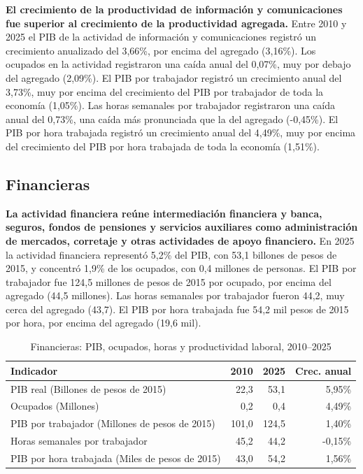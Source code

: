 \textbf{El crecimiento de la productividad de información y comunicaciones fue superior al crecimiento de la productividad agregada.} Entre 2010 y 2025 el PIB de la actividad de información y comunicaciones registró un crecimiento anualizado del 3,66\%, por encima del agregado (3,16\%). Los ocupados en la actividad registraron una caída anual del 0,07\%, muy por debajo del agregado (2,09\%). El PIB por trabajador registró un crecimiento anual del 3,73\%, muy por encima del crecimiento del PIB por trabajador de toda la economía (1,05\%). Las horas semanales por trabajador registraron una caída anual del 0,73\%, una caída más pronunciada que la del agregado (-0,45\%). El PIB por hora trabajada registró un crecimiento anual del 4,49\%, muy por encima del crecimiento del PIB por hora trabajada de toda la economía (1,51\%).

\subsection{Financieras}

\textbf{La actividad financiera reúne intermediación financiera y banca, seguros, fondos de pensiones y servicios auxiliares como administración de mercados, corretaje y otras actividades de apoyo financiero.} En 2025 la actividad financiera representó 5,2\% del PIB, con 53,1 billones de pesos de 2015, y concentró 1,9\% de los ocupados, con 0,4 millones de personas. El PIB por trabajador fue 124,5 millones de pesos de 2015 por ocupado, por encima del agregado (44,5 millones). Las horas semanales por trabajador fueron 44,2, muy cerca del agregado (43,7). El PIB por hora trabajada fue 54,2 mil pesos de 2015 por hora, por encima del agregado (19,6 mil).

\begin{table}[H]
\centering
\caption{Financieras: PIB, ocupados, horas y productividad laboral, 2010--2025}
\label{tab:sector_k_productividad}
\small
\begin{tabular}{lrrr}
\toprule
Indicador & 2010 & 2025 & Crec. anual \\
\midrule
PIB real  (Billones de pesos de 2015) & 22,3 & 53,1 & 5,95\% \\
Ocupados (Millones) & 0,2 & 0,4 & 4,49\% \\
PIB por trabajador (Millones de pesos de 2015) & 101,0 & 124,5 & 1,40\% \\
Horas semanales por trabajador & 45,2 & 44,2 & -0,15\% \\
PIB por hora trabajada (Miles de pesos de 2015) & 43,0 & 54,2 & 1,56\% \\
\bottomrule
\end{tabular}
\end{table}

